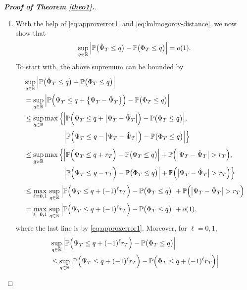 \documentclass[a4paper,12pt]{article}
\numberwithin{equation}{section}
\begin{document}
\begin{proof}[\textnormal{\textbf{Proof of Theorem \ref{theo1}.}}]
\begin{enumerate}[label=\textit{Step \arabic*.}, leftmargin=0cm, itemindent=1.45cm]
\item With the help of \eqref{eq:approxerror1} and \eqref{eq:kolmogorov-distance}, we now show that 
\begin{equation}\label{eq:kolmogorov-distance-hat}
\sup_{q \in \mathbb{R}} \Big| \mathbb{P} \big( \hat{\Psi}_T \le q \big) - \mathbb{P} \big( \Phi_T \le q \big) \Big| = o(1).
\end{equation}
To start with, the above supremum can be bounded by 
\begin{align}
 & \sup_{q \in \reals} \Big| \pr \big( \hat{\Psi}_T \le q \big) - \pr \big( \Phi_T \le q \big) \Big| \nonumber \\
 & = \sup_{q \in \reals} \Big| \pr \Big( \Psi_T \le q + \big\{ \Psi_T - \hat{\Psi}_T \big\} \Big) - \pr \big( \Phi_T \le q \big) \Big| \nonumber \\
 & \le \sup_{q \in \reals} \max \Big\{ \Big| \pr \Big( \Psi_T \le q + \big| \Psi_T - \hat{\Psi}_T \big| \Big) - \pr \big( \Phi_T \le q \big) \Big|, \nonumber \\
 & \phantom{\le \sup_{q \in \reals} \max \Big\{ \ } \Big| \pr \Big( \Psi_T \le q - \big| \Psi_T - \hat{\Psi}_T \big| \Big) - \pr \big( \Phi_T \le q \big) \Big| \Big\} \nonumber \\
 & \le \sup_{q \in \reals} \max \Big\{ \Big| \pr \Big( \Psi_T \le q + r_T \Big) - \pr \big( \Phi_T \le q \big) \Big| + \pr \Big( \big| \Psi_T - \hat{\Psi}_T \big| > r_T \Big), \nonumber \\
 & \phantom{\le \sup_{q \in \reals} \max \Big\{ \ } \Big| \pr \Big( \Psi_T \le q - r_T \Big) - \pr \big( \Phi_T \le q \big) \Big| + \pr \Big( \big| \Psi_T - \hat{\Psi}_T \big| > r_T \Big) \Big\} \nonumber \\
 & \le \max_{\ell=0,1} \, \sup_{q \in \reals} \Big| \pr \Big( \Psi_T \le q + (-1)^\ell r_T \Big) - \pr \big( \Phi_T \le q \big) \Big| + \pr \Big( \big| \Psi_T - \hat{\Psi}_T \big| > r_T \Big) \nonumber \\
 & = \max_{\ell=0,1} \, \sup_{q \in \reals} \Big| \pr \Big( \Psi_T \le q + (-1)^\ell r_T \Big) - \pr \big( \Phi_T \le q \big) \Big| + o(1), \label{eq:step3:a}
\end{align}
where the last line is by \eqref{eq:approxerror1}. Moreover, for $\ell=0,1$, 
\begin{align}
 & \sup_{q \in \reals} \Big| \pr \Big( \Psi_T \le q + (-1)^\ell r_T \Big) - \pr \big( \Phi_T \le q \big) \Big| \nonumber \\
 & \le \sup_{q \in \reals} \Big| \pr \Big( \Psi_T \le q + (-1)^\ell r_T \Big) - \pr \Big( \Phi_T \le q + (-1)^\ell r_T \Big) \Big| \nonumber \\

\end{align}
\end{enumerate}
\end{proof}
\end{document}

